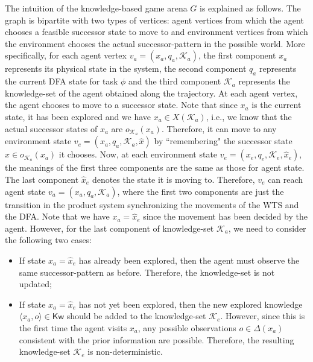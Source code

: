 \documentclass{ifacconf}
\def \K{\mathcal{K}}
\def \<{\langle}
\def \>{\rangle}
\def \kw{\textsf{Kw}}
\begin{document}
The intuition of the knowledge-based game arena $G$ is explained as follows. The graph is bipartite with two types of vertices: agent vertices from which the agent chooses a feasible successor state to move to and 
environment vertices from which the environment chooses the actual successor-pattern in the possible world. More specifically, for each agent vertex $v_a=(x_a,q_a,\K_a)$, the first component $x_a$ represents its physical state in the system, the second component $q_a$ represents the current DFA state for task $\phi$ and the third component $\K_a$ represents the knowledge-set of the agent obtained along the trajectory.  
At each agent vertex, the agent chooses to move to a successor state. Note that since $x_a$ is the current state, it has been explored and we have $x_a\in X(\K_a)$, i.e., we know that the actual successor states of $x_a$ are $o_{\K_a}(x_a)$. Therefore,  it can move to any environment state $v_e=(x_a,q_a,\K_a, \hat{x})$ by ``remembering" the successor state $\hat{x}\in o_{\K_a}(x_a)$ it chooses. 
Now, at each environment state  $v_e=(x_e,q_e,\K_e,\hat{x}_e)$, the meanings of the first three components are the same as those for agent state. The last component $\hat{x}_e$ denotes the state it is moving to.  
Therefore, $v_e$ can reach agent state $v_a=(x_a,q_a,\K_a)$, where the first two components are just the transition in the product system synchronizing the movements of the WTS and the DFA. Note that we have $x_a=\hat{x}_e$ since the movement has been decided by the agent. However, 
for the last component of knowledge-set $\K_a$, we need to consider the following two cases:
\begin{itemize}
    \item 
    If state $x_a\!=\!\hat{x}_e$ has already been explored, then the agent must observe the same successor-pattern as before. Therefore, the knowledge-set is not updated;  
    \item 
    If state $x_a\!=\!\hat{x}_e$ has not yet been explored, then the new explored knowledge $\<x_a, o\>\in \kw$ should be added to the knowledge-set $\K_e$. However, since this is the first time the agent visits $x_a$, any possible observations $o\in \Delta(x_a)$ consistent with the prior information are possible. Therefore, the resulting knowledge-set $\K_e$ is non-deterministic. 
\end{itemize}
\end{document}

